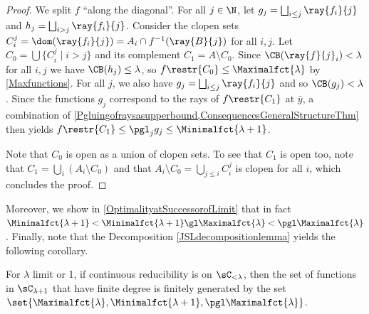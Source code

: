 \begin{proof}
We split $f$ ``along the diagonal''. For all $j\in \N$, let $g_j=\bigsqcup_{i\leq j} \ray{f_i}{j}$ and $h_{j}=\bigsqcup_{i> j} \ray{f_i}{j}$.
Consider the clopen sets $C^{j}_i=\dom (\ray{f_i}{j})=A_i\cap f^{-1}(\ray{B}{j})$ for all $i,j$. Let $C_{0}=\bigcup\{C^{j}_i\mid i > j\}$ and its complement $C_1=A\setminus C_0$. Since $\CB(\ray{f}{j}_i)<\lambda$ for all $i,j$ we have $\CB(h_j)\leq\lambda$,
so $f\restr{C_0}\leq\Maximalfct{\lambda}$ by \cref{Maxfunctions}.
For all $j$, we also have $g_j=\bigsqcup_{i\leq j}\ray{f_i}{j}$ and so $\CB(g_j)<\lambda$. Since the functions $g_j$ correspond to the rays of $f\restr{C_1}$ at $\bar{y}$, a combination of \cref{Pgluingofraysasupperbound,ConsequencesGeneralStructureThm} then yields
$f\restr{C_1}\leq\pgl_j g_j \leq\Minimalfct{\lambda+1}$.

Note that $C_0$ is open as a union of clopen sets. To see that $C_1$ is open too, note that $C_1=\bigcup_i (A_i\setminus C_0)$ and that $A_i\setminus C_0=\bigcup_{j\leq i} C^{j}_i$ is clopen for all $i$, which concludes the proof.
\end{proof}

Moreover, we show in \cref{OptimalityatSuccessorofLimit} that in fact $\Minimalfct{\lambda+1}<\Minimalfct{\lambda+1}\gl\Maximalfct{\lambda}< \pgl\Maximalfct{\lambda}$. Finally, note that
the Decomposition \cref{JSLdecompositionlemma} yields the following corollary.

\begin{corollary}\label{finitedegreedamuddafuckaz}
For $\lambda$ limit or 1, if continuous reducibility is \bqo{} on $\sC_{<\lambda}$, then
the set of functions in $\sC_{\lambda+1}$ that have finite degree is finitely generated by the set $\set{\Maximalfct{\lambda},\Minimalfct{\lambda+1},\pgl\Maximalfct{\lambda}}$.
\end{corollary}


